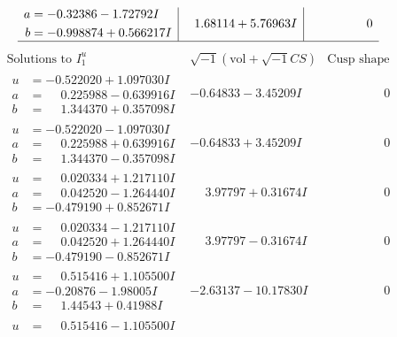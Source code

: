 \documentclass[1p]{elsarticle_modified}
\theoremstyle{definition}
\newcommand{\I}{\sqrt{-1}}
\begin{document}
$$\begin{array}{c|c|c}
\begin{aligned}
a &= -0.32386 - 1.72792 I \\
b &= -0.998874 + 0.566217 I\end{aligned}
 & \phantom{-}1.68114 + 5.76963 I & \phantom{-0.000000 } 0\\
 \hline 
 \end{array}$$\newpage$$\begin{array}{c|c|c}  
\text{Solutions to }I^u_{1}& \I (\text{vol} + \sqrt{-1}CS) & \text{Cusp shape}\\
 \hline 
\begin{aligned}
u &= -0.522020 + 1.097030 I \\
a &= \phantom{-}0.225988 - 0.639916 I \\
b &= \phantom{-}1.344370 + 0.357098 I\end{aligned}
 & -0.64833 - 3.45209 I & \phantom{-0.000000 } 0 \\ \hline\begin{aligned}
u &= -0.522020 - 1.097030 I \\
a &= \phantom{-}0.225988 + 0.639916 I \\
b &= \phantom{-}1.344370 - 0.357098 I\end{aligned}
 & -0.64833 + 3.45209 I & \phantom{-0.000000 } 0 \\ \hline\begin{aligned}
u &= \phantom{-}0.020334 + 1.217110 I \\
a &= \phantom{-}0.042520 - 1.264440 I \\
b &= -0.479190 + 0.852671 I\end{aligned}
 & \phantom{-}3.97797 + 0.31674 I & \phantom{-0.000000 } 0 \\ \hline\begin{aligned}
u &= \phantom{-}0.020334 - 1.217110 I \\
a &= \phantom{-}0.042520 + 1.264440 I \\
b &= -0.479190 - 0.852671 I\end{aligned}
 & \phantom{-}3.97797 - 0.31674 I & \phantom{-0.000000 } 0 \\ \hline\begin{aligned}
u &= \phantom{-}0.515416 + 1.105500 I \\
a &= -0.20876 - 1.98005 I \\
b &= \phantom{-}1.44543 + 0.41988 I\end{aligned}
 & -2.63137 - 10.17830 I & \phantom{-0.000000 } 0 \\ \hline\begin{aligned}
u &= \phantom{-}0.515416 - 1.105500 I \\

\end{aligned}
\end{array}$$
\end{document}

